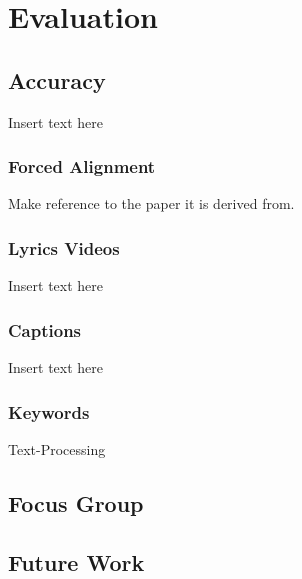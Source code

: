 \chapter{Evaluation}

\section{Accuracy}

Insert text here

\subsection{Forced Alignment}

Make reference to the paper it is derived from.

\subsection{Lyrics Videos}

Insert text here

\subsection{Captions}

Insert text here

\subsection{Keywords}

Text-Processing

\section{Focus Group}

\section{Future Work}